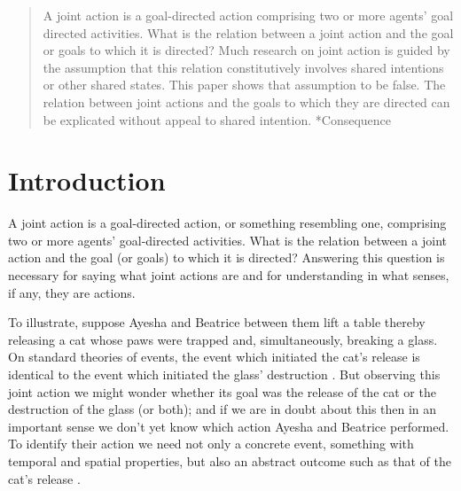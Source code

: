 \documentclass[12pt,a4paper]{extarticle}
\begin{document}
\setlength\footnotesep{1em}


\maketitle

\begin{abstract}
A joint action is a goal-directed action comprising two or more agents' goal directed activities.  What is the relation between a joint action and the goal or goals to which it is directed?  
Much research on joint action is guided by the assumption that this relation constitutively involves shared intentions or other shared states.  
This paper shows that assumption to be false.
The relation between joint actions and the goals to which they are directed can be  explicated without appeal to shared intention.  
*Consequence
\end{abstract}


\section{Introduction}
A joint action is a goal-directed action, or something resembling one, comprising two or more agents' goal-directed activities.  What is the relation between a joint action and the goal (or goals) to which it is directed?  
Answering this question is necessary for saying what joint actions are and for understanding in what senses, if any, they are actions.


To illustrate, suppose Ayesha and Beatrice between them lift a table thereby releasing a cat whose paws were trapped and,  simultaneously, breaking a glass.  On standard theories of events, the event which initiated the cat's release is identical to the event which initiated the glass' destruction \citep{Davidson:1969ie}.  But observing this joint action we might wonder whether its goal was the release of the cat or the destruction of the glass (or both); and if we are in doubt about this then in an important sense we don't yet know which action Ayesha and Beatrice performed.  To identify their action we need not only a concrete event, something with temporal and spatial properties, but also an abstract outcome such as that of the cat's release \citep{Davidson:1971fz}.
\end{document}
